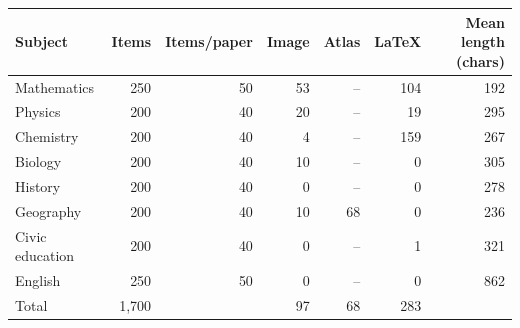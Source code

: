 \begin{tabular}{@{}lrrrrrr@{}}
\toprule
Subject & Items & Items/paper & Image & Atlas & LaTeX & Mean length (chars) \\
\midrule
Mathematics & 250 & 50 & 53 & -- & 104 & 192 \\
Physics & 200 & 40 & 20 & -- & 19 & 295 \\
Chemistry & 200 & 40 & 4 & -- & 159 & 267 \\
Biology & 200 & 40 & 10 & -- & 0 & 305 \\
History & 200 & 40 & 0 & -- & 0 & 278 \\
Geography & 200 & 40 & 10 & 68 & 0 & 236 \\
Civic education & 200 & 40 & 0 & -- & 1 & 321 \\
English & 250 & 50 & 0 & -- & 0 & 862 \\
\midrule
Total & 1,700 & & 97 & 68 & 283 & \\
\bottomrule
\end{tabular}
